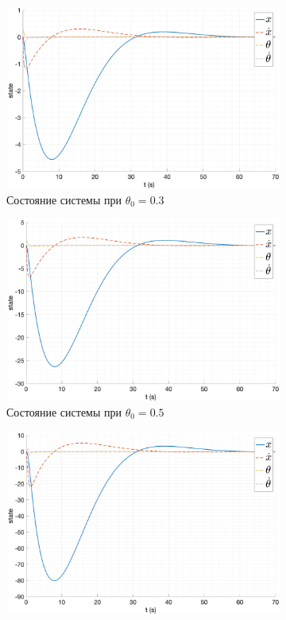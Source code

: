 \begin{figure}[ht!]
    \centering
    \begin{subfigure}[b]{0.45\textwidth}
        \centering
        \includegraphics[width=\textwidth]{media/plots/LQR/state_2.png}
        \caption{Состояние системы при $\theta_0 = 0.3$}
    \end{subfigure}
    \begin{subfigure}[b]{0.45\textwidth}
        \centering
        \includegraphics[width=\textwidth]{media/plots/LQR/state_3.png}
        \caption{Состояние системы при $\theta_0 = 0.5$}
    \end{subfigure}
    \begin{subfigure}[b]{0.45\textwidth}
        \centering
        \includegraphics[width=\textwidth]{media/plots/LQR/state_4.png}

\end{subfigure}
\end{figure}
